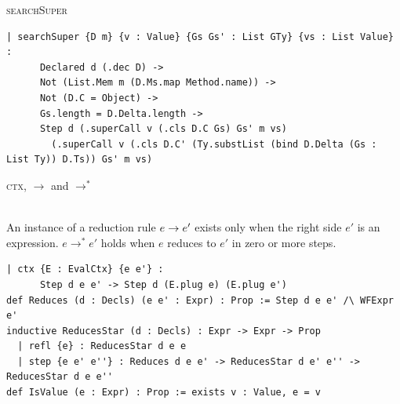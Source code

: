 \begin{cmp}{\textsc{searchSuper}}
\begin{paperside}
\end{paperside}
\begin{leanside}
\begin{lstlisting}[style=leanside]
  | searchSuper {D m} {v : Value} {Gs Gs' : List GTy} {vs : List Value} :
      Declared d (.dec D) ->
      Not (List.Mem m (D.Ms.map Method.name)) ->
      Not (D.C = Object) ->
      Gs.length = D.Delta.length ->
      Step d (.superCall v (.cls D.C Gs) Gs' m vs)
        (.superCall v (.cls D.C' (Ty.substList (bind D.Delta (Gs : List Ty)) D.Ts)) Gs' m vs)
\end{lstlisting}
\end{leanside}
\nomapping
\end{cmp}

\begin{cmp}{\textsc{ctx}, $\rightarrow$ and $\rightarrow^*$}
\begin{paperside}
\\[1ex]
An instance of a reduction rule $e\rightarrow e'$ exists only when the right side $e'$ is an expression.
$e\rightarrow^* e'$ holds when $e$ reduces to $e'$ in zero or more steps.
\end{paperside}
\begin{leanside}
\begin{lstlisting}[style=leanside]
  | ctx {E : EvalCtx} {e e'} :
      Step d e e' -> Step d (E.plug e) (E.plug e')
def Reduces (d : Decls) (e e' : Expr) : Prop := Step d e e' /\ WFExpr e'
inductive ReducesStar (d : Decls) : Expr -> Expr -> Prop
  | refl {e} : ReducesStar d e e
  | step {e e' e''} : Reduces d e e' -> ReducesStar d e' e'' -> ReducesStar d e e''
def IsValue (e : Expr) : Prop := exists v : Value, e = v
\end{lstlisting}
\end{leanside}
\end{cmp}

